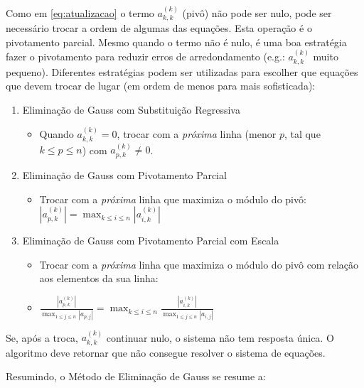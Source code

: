 \documentclass[final,5p]{elsarticle}
\numberwithin{equation}{section}
\begin{document}
            Como em \ref{eq:atualizacao} o termo $a^{(k)}_{k,k}$ (pivô) não pode ser nulo, pode ser necessário trocar a ordem de algumas das equações. Esta operação é o pivotamento parcial. Mesmo quando o termo não é nulo, é uma boa estratégia fazer o pivotamento para reduzir erros de arredondamento (e.g.: $a^{(k)}_{k,k}$ muito pequeno). Diferentes estratégias podem ser utilizadas para escolher que equações que devem trocar de lugar (em ordem de menos para mais sofisticada):

            \begin{enumerate}
                \item Eliminação de Gauss com Substituição Regressiva
                \begin{itemize}
                    \item [] Quando $a^{(k)}_{k,k}=0$, trocar com a \emph{próxima} linha (menor $p$, tal que $k \leq p \leq n$) com $a^{(k)}_{p,k} \neq 0$.
                \end{itemize}
                \item Eliminação de Gauss com Pivotamento Parcial
                \begin{itemize}
                    \item[] Trocar com a \emph{próxima} linha que maximiza o módulo do pivô: $|a^{(k)}_{p,k}|=\max_{k \leq i \leq n} |a^{(k)}_{i,k}|$
                \end{itemize}
                \item Eliminação de Gauss com Pivotamento Parcial com Escala
                \begin{itemize}
                    \item[] Trocar com a \emph{próxima} linha que maximiza o módulo do pivô com relação aos elementos da sua linha:
                    \item[] $\frac{|a^{(k)}_{p,k}|}{\max_{1 \leq j \leq n} |a_{p,j}|}=\max_{k \leq i \leq n} \frac{|a^{(k)}_{i,k}|}{\max_{1 \leq j \leq n} |a_{i,j}|}$
                \end{itemize}
            \end{enumerate}

            Se, após a troca, $a^{(k)}_{k,k}$ continuar nulo, o sistema não tem resposta única. O algoritmo deve retornar que não consegue resolver o sistema de equações.

            Resumindo, o Método de Eliminação de Gauss se resume a:
\end{document}
